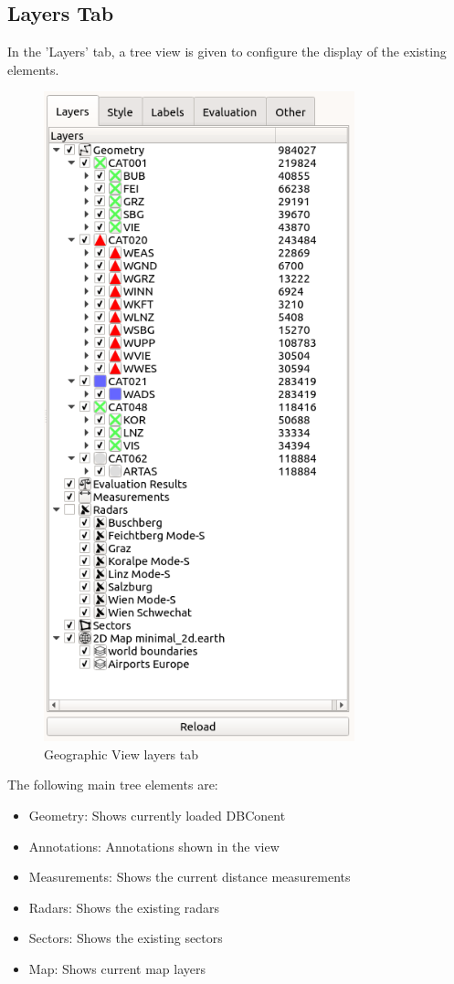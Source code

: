 \subsection{Layers Tab}

In the 'Layers' tab, a tree view is given to configure the display of the existing elements. 

\begin{figure}[H]
  \center
    \includegraphics[width=9cm,frame]{figures/geoview_config_panel.png}
  \caption{Geographic View layers tab}
\end{figure}

The following main tree elements are:\\

\begin{itemize}
 \item Geometry: Shows currently loaded DBConent
 \item Annotations: Annotations shown in the view
 \item Measurements: Shows the current distance measurements
 \item Radars: Shows the existing radars 
 \item Sectors: Shows the existing sectors
 \item Map: Shows current map layers
\end{itemize} 
 \ \\

